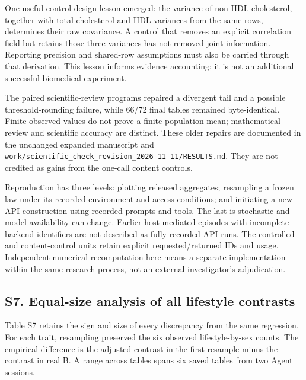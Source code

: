 \documentclass[sigconf,anonymous,nonacm]{acmart}
\begin{document}
One useful control-design lesson emerged: the variance of non-HDL cholesterol, together with total-cholesterol and HDL variances from the same rows, determines their raw covariance. A control that removes an explicit correlation field but retains those three variances has not removed joint information. Reporting precision and shared-row assumptions must also be carried through that derivation. This lesson informs evidence accounting; it is not an additional successful biomedical experiment.


The paired scientific-review programs repaired a divergent tail and a possible threshold-rounding failure, while 66/\allowbreak{}72 final tables remained byte-identical. Finite observed values do not prove a finite population mean; mathematical review and scientific accuracy are distinct. These older repairs are documented in the unchanged expanded manuscript and \texttt{work/\allowbreak{}scientific\_\allowbreak{}check\_\allowbreak{}revision\_\allowbreak{}2026-\allowbreak{}11-\allowbreak{}11/\allowbreak{}RESULTS.md}. They are not credited as gains from the one-call content controls.


Reproduction has three levels: plotting released aggregates; resampling a frozen law under its recorded environment and access conditions; and initiating a new API construction using recorded prompts and tools. The last is stochastic and model availability can change. Earlier host-mediated episodes with incomplete backend identifiers are not described as fully recorded API runs. The controlled and content-control units retain explicit requested/\allowbreak{}returned IDs and usage. Independent numerical recomputation here means a separate implementation within the same research process, not an external investigator's adjudication.



\subsection*{S7. Equal-size analysis of all lifestyle contrasts}

Table S7 retains the sign and size of every discrepancy from the same regression. For each trait, resampling preserved the six observed lifestyle-by-sex counts. The empirical difference is the adjusted contrast in the first resample minus the contrast in real B. A range across tables spans six saved tables from two Agent sessions.
\end{document}
